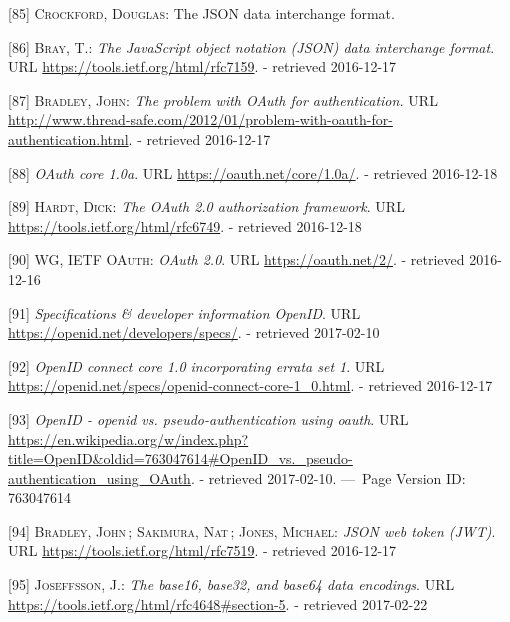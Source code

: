\documentclass[12pt,english,a4paper,titlepage,cleardoublepage=empty,dottedtoc]{report}
\begin{document}
\hypertarget{ref-web_spec_json}{}
{[}85{]} \textsc{Crockford, Douglas}: The JSON data interchange format.

\hypertarget{ref-web_rfc_json}{}
{[}86{]} \textsc{Bray, T.}: \emph{The JavaScript object notation (JSON)
data interchange format}. URL \url{https://tools.ietf.org/html/rfc7159}.
- retrieved 2016-12-17

\hypertarget{ref-web_2012_problem-with-oauth-for-authentication}{}
{[}87{]} \textsc{Bradley, John}: \emph{The problem with OAuth for
authentication.} URL
\url{http://www.thread-safe.com/2012/01/problem-with-oauth-for-authentication.html}.
- retrieved 2016-12-17

\hypertarget{ref-web_spec_oauth-1a}{}
{[}88{]} \emph{OAuth core 1.0a}. URL \url{https://oauth.net/core/1.0a/}.
- retrieved 2016-12-18

\hypertarget{ref-web_spec_oauth-2}{}
{[}89{]} \textsc{Hardt, Dick}: \emph{The OAuth 2.0 authorization
framework}. URL \url{https://tools.ietf.org/html/rfc6749}. - retrieved
2016-12-18

\hypertarget{ref-web_2016_oauth-2}{}
{[}90{]} \textsc{WG, IETF OAuth}: \emph{OAuth 2.0}. URL
\url{https://oauth.net/2/}. - retrieved 2016-12-16

\hypertarget{ref-web_spec_openid-spec-index}{}
{[}91{]} \emph{Specifications \& developer information OpenID}. URL
\url{https://openid.net/developers/specs/}. - retrieved 2017-02-10

\hypertarget{ref-web_spec_openid-connect-1}{}
{[}92{]} \emph{OpenID connect core 1.0 incorporating errata set 1}. URL
\url{https://openid.net/specs/openid-connect-core-1_0.html}. - retrieved
2016-12-17

\hypertarget{ref-web_2017_wikipedia_openid-vs-pseudo-oauth}{}
{[}93{]} \emph{OpenID - openid vs. pseudo-authentication using oauth}.
URL
\url{https://en.wikipedia.org/w/index.php?title=OpenID\&oldid=763047614\#OpenID_vs._pseudo-authentication_using_OAuth}.
- retrieved 2017-02-10. ---~Page Version ID: 763047614

\hypertarget{ref-web_spec_json-web-token}{}
{[}94{]} \textsc{Bradley, John}\,; \textsc{Sakimura, Nat}\,;
\textsc{Jones, Michael}: \emph{JSON web token (JWT)}. URL
\url{https://tools.ietf.org/html/rfc7519}. - retrieved 2016-12-17

\hypertarget{ref-web_spec_base64url}{}
{[}95{]} \textsc{Joseffsson, J.}: \emph{The base16, base32, and base64
data encodings}. URL
\url{https://tools.ietf.org/html/rfc4648\#section-5}. - retrieved
2017-02-22
\end{document}
